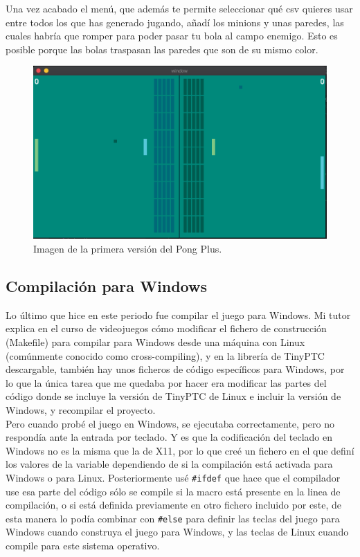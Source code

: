 Una vez acabado el menú, que además te permite seleccionar qué \gls{csv} quieres usar entre todos los que has generado jugando, añadí los minions y unas paredes, las cuales habría que romper para poder pasar tu bola al campo enemigo. Esto es posible porque las bolas traspasan las paredes que son de su mismo color.

\begin{figure}[H]
	\centering
	\includegraphics[width=12cm]{archivos/imagenes/pong-plus-con-minions-y-paredes.png}
	\caption{Imagen de la primera versión del Pong Plus.}
\end{figure}

\subsection{Compilación para Windows}
Lo último que hice en este periodo fue compilar el juego para Windows. Mi tutor explica en el curso de videojuegos \cite{CursoMotorC++} cómo modificar el fichero de construcción (Makefile) para compilar para Windows desde una máquina con Linux (comúnmente conocido como cross-compiling), y en la librería de TinyPTC descargable, también hay unos ficheros de código específicos para Windows, por lo que la única tarea que me quedaba por hacer era modificar las partes del código donde se incluye la versión de TinyPTC de Linux e incluir la versión de Windows, y recompilar el proyecto. 
\\
Pero cuando probé el juego en Windows, se ejecutaba correctamente, pero no respondía ante la entrada por teclado. Y es que la codificación del teclado en Windows no es la misma que la de X11, por lo que creé un fichero en el que definí los valores de la variable dependiendo de si la compilación está activada para Windows o para Linux. Posteriormente usé \texttt{\#ifdef} que hace que el compilador use esa parte del código sólo se compile si la macro está presente en la linea de compilación, o si está definida previamente en otro fichero incluido por este, de esta manera lo podía combinar con \texttt{\#else} para definir las teclas del juego para Windows cuando construya el juego para Windows, y las teclas de Linux cuando compile para este sistema operativo.

